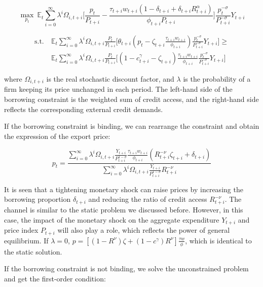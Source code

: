 $$
\max_{p_t} \ \mathbb{E}_t \sum_{i=0}^{\infty} \lambda^i \Omega_{i,t+i} \biggr[ \frac{p_t}{P_{t+i}}-\frac{\tau_{t+i} w_{t+i}(1-\delta_{t+i}+\delta_{t+i} R_{t+i}^\alpha)}{\phi_{t+i}P_{t+i}} \biggr] \frac{p_t^{-\sigma}}{P_{t+i}^{-\sigma}}Y_{t+i}
$$

\begin{align*}
\text{s.t.} \ &\mathbb{E}_t \sum_{i=0}^{\infty} \lambda^i \Omega_{i,t+i} \frac{P_t}{P_{t+i}} \biggr[ \theta_{t+i} (p_t-\zeta_{t+i} \frac{\tau_{t+i} w_{t+i}}{\phi_{t+i}}) \frac{p_t^{-\sigma}}{P_{t+i}^{-\sigma}}Y_{t+i} \biggr] \geq  \\
 &\mathbb{E}_t \sum_{i=0}^{\infty} \lambda^i \Omega_{i,t+i} \frac{P_t}{P_{t+i}} \biggr[(1-c_{t+i}^{\gamma}-\zeta_{t+i}) \frac{\tau_{t+i} w_{t+i}}{\phi_{t+i}} \frac{p_t^{-\sigma}}{P_{t+i}^{-\sigma}}Y_{t+i}\biggr]    
\end{align*}

where $\Omega_{i,t+i}$ is the real stochastic discount factor, and $\lambda$ is the probability of a firm keeping its price unchanged in each period. The left-hand side of the borrowing constraint is the weighted sum of credit access, and the right-hand side reflects the corresponding external credit demands.

If the borrowing constraint is binding, we can rearrange the constraint and obtain the expression of the export price:

\begin{equation}
p_t=\frac{\sum_{i=0}^{\infty} \lambda^i \Omega_{i,t+i}\frac{Y_{t+i}}{P_{t+i}^{1-\sigma}}\frac{\tau_{t+i}w_{t+i}}{\phi_{t+i}}(R_{t+i}^{-\nu}\zeta_{t+i}+\delta_{t+i})}{\sum_{i=0}^{\infty} \lambda^i \Omega_{i,t+i}\frac{Y_{t+i}}{P_{t+i}^{1-\sigma}}R_{t+i}^{-\nu}}
\end{equation}

It is seen that a tightening monetary shock can raise prices by increasing the borrowing proportion $\delta_{t+i}$ and reducing the ratio of credit access $R_{t+i}^{-\nu}$. The channel is similar to the static problem we discussed before. However, in this case, the impact of the monetary shock on the aggregate expenditure $Y_{t+i}$ and price index $P_{t+i}$ will also play a role, which reflects the power of general equilibrium. If $\lambda=0$, $p=[(1-R^{\nu})\zeta+(1-c^\gamma)R^{\nu}] \frac{\tau w}{\phi}$, which is identical to the static solution.


If the borrowing constraint is not binding, we solve the unconstrained problem and get the first-order condition:


